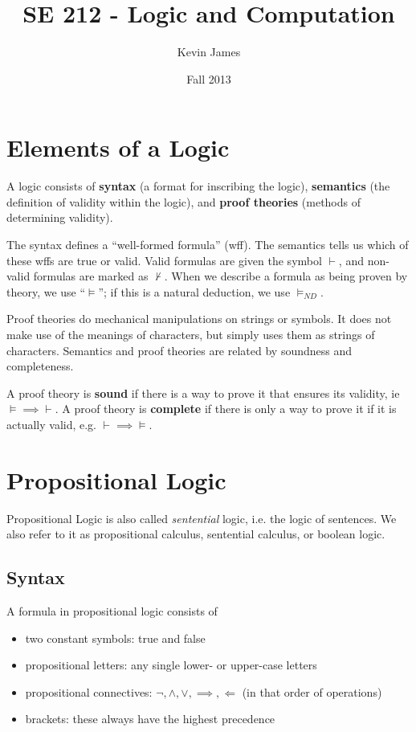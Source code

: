 \documentclass[12pt]{article}
\newcommand{\implied}{\Longleftarrow}
\begin{document}
\title{SE 212 - Logic and Computation}
\author{Kevin James}
\date{\vspace{-2ex}Fall 2013}
\maketitle\HRule

\section*{Elements of a Logic}
A logic consists of {\bf syntax} (a format for inscribing the logic), {\bf semantics} (the definition of validity within the logic), and {\bf proof theories} (methods of determining validity).

The syntax defines a ``well-formed formula'' (wff). The semantics tells us which of these wffs are true or valid. Valid formulas are given the symbol $\vdash$, and non-valid formulas are marked as $\not\vdash$. When we describe a formula as being proven by theory, we use ``$\vDash$''; if this is a natural deduction, we use $\vDash_{ND}$.

Proof theories do mechanical manipulations on strings or symbols. It does not make use of the meanings of characters, but simply uses them as strings of characters. Semantics and proof theories are related by soundness and completeness.

A proof theory is {\bf sound} if there is a way to prove it that ensures its validity, ie $\vDash\implies\vdash$. A proof theory is {\bf complete} if there is only a way to prove it if it is actually valid, e.g. $\vdash\implies\vDash$.

\section*{Propositional Logic}
Propositional Logic is also called {\it sentential} logic, i.e. the logic of sentences. We also refer to it as propositional calculus, sentential calculus, or boolean logic.

\subsection*{Syntax}
A formula in propositional logic consists of
\begin{itemize}
\item two constant symbols: true and false
\item propositional letters: any single lower- or upper-case letters
\item propositional connectives: $\neg, \land, \lor, \implies, \implied$ (in that order of operations)
\item brackets: these always have the highest precedence
\end{itemize}
\end{document}
